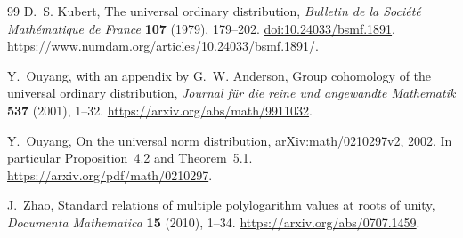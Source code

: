 \documentclass[11pt,a4paper]{article}
\numberwithin{equation}{section}
\theoremstyle{plain}
\theoremstyle{definition}
\theoremstyle{remark}
\begin{document}
\begin{thebibliography}{99}
D.~S. Kubert, The universal ordinary distribution,
\emph{Bulletin de la Soci\'et\'e Math\'ematique de France}
\textbf{107} (1979), 179--202.
\href{https://doi.org/10.24033/bsmf.1891}{doi:10.24033/bsmf.1891}.
\url{https://www.numdam.org/articles/10.24033/bsmf.1891/}.

Y.~Ouyang, with an appendix by G.~W. Anderson,
Group cohomology of the universal ordinary distribution,
\emph{Journal f\"ur die reine und angewandte Mathematik}
\textbf{537} (2001), 1--32.
\url{https://arxiv.org/abs/math/9911032}.

Y.~Ouyang, On the universal norm distribution,
arXiv:math/0210297v2, 2002.
In particular Proposition~4.2 and Theorem~5.1.
\url{https://arxiv.org/pdf/math/0210297}.

J.~Zhao, Standard relations of multiple polylogarithm values at roots
of unity, \emph{Documenta Mathematica} \textbf{15} (2010), 1--34.
\url{https://arxiv.org/abs/0707.1459}.

\end{thebibliography}
\end{document}
